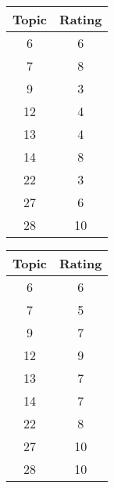 \begin{table}[H]
  \begin{subtable}{.5\linewidth}
    \centering
    \begin{tabular}{c c} \toprule
      Topic & Rating \\ \midrule
      6     & 6  \\ \midrule
      7     & 8  \\ \midrule
      9     & 3  \\ \midrule
      12    & 4   \\ \midrule
      13    & 4   \\ \midrule
      14    & 8   \\ \midrule
      22    & 3   \\ \midrule
      27    & 6   \\ \midrule
      28    & 10   \\ \bottomrule
    \end{tabular}
  \end{subtable}
  \begin{subtable}{.5\linewidth}
    \centering
    \begin{tabular}{c c} \toprule
      Topic & Rating \\ \midrule
      6     & 6  \\ \midrule
      7     & 5  \\ \midrule
      9     & 7  \\ \midrule
      12    & 9   \\ \midrule
      13    & 7   \\ \midrule
      14    & 7   \\ \midrule
      22    & 8   \\ \midrule
      27    & 10   \\ \midrule
      28    & 10   \\ \bottomrule
    \end{tabular}
  \end{subtable}
\end{table}
